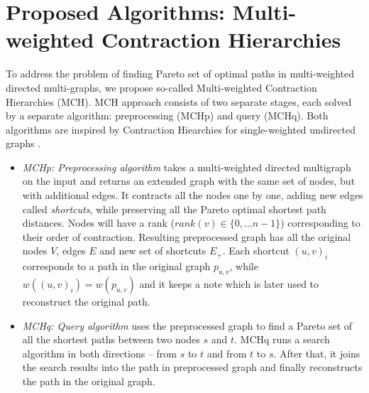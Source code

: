 
\section{Proposed Algorithms: Multi-weighted Contraction Hierarchies}
\label{secAlgorithms}

To address the problem of finding Pareto set of optimal paths in multi-weighted directed multi-graphs, we propose so-called Multi-weighted Contraction Hierarchies (MCH). 
MCH approach consists of two separate stages, each solved by a separate algorithm: preprocessing (MCHp) and query (MCHq). 
Both algorithms are inspired by Contraction Hiearchies for single-weighted undirected graphs \cite{geisberger2008contraction}.

\begin{itemize}
  \item {\em MCHp: Preprocessing algorithm} takes a multi-weighted directed multigraph on the input and returns an extended graph with the same set of nodes, but with additional edges. It contracts all the nodes one by one, adding new edges called \emph{shortcuts}, while preserving all the Pareto optimal shortest path distances. 
Nodes will have a rank ($rank(v) \in \{0, \dots n-1\}$) corresponding to their order of contraction.
Resulting preprocessed graph has all the original nodes $V$, edges $E$ and new set of shortcuts $E_+$.
Each shortcut $(u,v)_i$ corresponds to a path in the original graph $p_{u,v}$, while $w((u,v)_i) = w(p_{u,v})$ and it keeps a note which is later used to reconstruct the original path.
  \item {\em MCHq: Query algorithm} uses the preprocessed graph to find a Pareto set of all
the shortest paths between two nodes $s$ and $t$. MCHq runs a search algorithm in both directions -- from $s$ to $t$ and from $t$ to $s$. After that, it joins the search results into the path in preprocessed graph and finally reconstructs the path in the original graph. 
\end{itemize}




